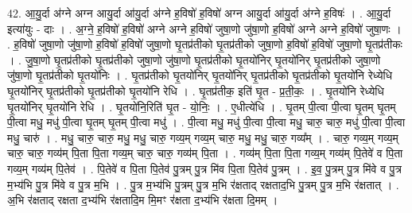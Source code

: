 \documentclass[17pt]{extarticle}
\begin{document}
42. आ॒यु॒र्दा अ॑ग्ने अग्न आयु॒र्दा आ॑यु॒र्दा अ॑ग्ने ह॒विषो॑ ह॒विषो॑ अग्न आयु॒र्दा आ॑यु॒र्दा अ॑ग्ने ह॒विषः॑ । . आ॒यु॒र्दा इत्या॑युः - दाः । . अ॒ग्ने॒ ह॒विषो॑ ह॒विषो॑ अग्ने अग्ने ह॒विषो॑ जुषा॒णो जु॑षा॒णो ह॒विषो॑ अग्ने अग्ने ह॒विषो॑ जुषा॒णः । . ह॒विषो॑ जुषा॒णो जु॑षा॒णो ह॒विषो॑ ह॒विषो॑ जुषा॒णो घृ॒तप्र॑तीको घृ॒तप्र॑तीको जुषा॒णो ह॒विषो॑ ह॒विषो॑ जुषा॒णो घृ॒तप्र॑तीकः । . जु॒षा॒णो घृ॒तप्र॑तीको घृ॒तप्र॑तीको जुषा॒णो जु॑षा॒णो घृ॒तप्र॑तीको घृ॒तयो॑निर् घृ॒तयो॑निर् घृ॒तप्र॑तीको जुषा॒णो जु॑षा॒णो घृ॒तप्र॑तीको घृ॒तयो॑निः । . घृ॒तप्र॑तीको घृ॒तयो॑निर् घृ॒तयो॑निर् घृ॒तप्र॑तीको घृ॒तप्र॑तीको घृ॒तयो॑नि रेध्येधि घृ॒तयो॑निर् घृ॒तप्र॑तीको घृ॒तप्र॑तीको घृ॒तयो॑नि रेधि । . घृ॒तप्र॑तीक॒ इति॑ घृ॒त - प्र॒ती॒कः॒ । . घृ॒तयो॑नि रेध्येधि घृ॒तयो॑निर् घृ॒तयो॑नि रेधि । . घृ॒तयो॑नि॒रिति॑ घृ॒त - यो॒निः॒ । . ए॒धीत्ये॑धि । . घृ॒तम् पी॒त्वा पी॒त्वा घृ॒तम् घृ॒तम् पी॒त्वा मधु॒ मधु॑ पी॒त्वा घृ॒तम् घृ॒तम् पी॒त्वा मधु॑ । . पी॒त्वा मधु॒ मधु॑ पी॒त्वा पी॒त्वा मधु॒ चारु॒ चारु॒ मधु॑ पी॒त्वा पी॒त्वा मधु॒ चारु॑ । . मधु॒ चारु॒ चारु॒ मधु॒ मधु॒ चारु॒ गव्य॒म् गव्य॒म् चारु॒ मधु॒ मधु॒ चारु॒ गव्य᳚म् । . चारु॒ गव्य॒म् गव्य॒म् चारु॒ चारु॒ गव्य॑म् पि॒ता पि॒ता गव्य॒म् चारु॒ चारु॒ गव्य॑म् पि॒ता । . गव्य॑म् पि॒ता पि॒ता गव्य॒म् गव्य॑म् पि॒तेवे॑ व पि॒ता गव्य॒म् गव्य॑म् पि॒तेव॑ । . पि॒तेवे॑ व पि॒ता पि॒तेव॑ पु॒त्रम् पु॒त्र मि॑व पि॒ता पि॒तेव॑ पु॒त्रम् । . इ॒व॒ पु॒त्रम् पु॒त्र मि॑वे व पु॒त्र म॒भ्य॑भि पु॒त्र मि॑वे व पु॒त्र म॒भि । . पु॒त्र म॒भ्य॑भि पु॒त्रम् पु॒त्र म॒भि र॑क्षताद् रक्षताद॒भि पु॒त्रम् पु॒त्र म॒भि र॑क्षतात् । . अ॒भि र॑क्षताद् रक्षता द॒भ्य॑भि र॑क्षतादि॒म मि॒मꣳ र॑क्षता द॒भ्य॑भि र॑क्षता दि॒मम् । \newline
\pagebreak
{}
\end{document}
